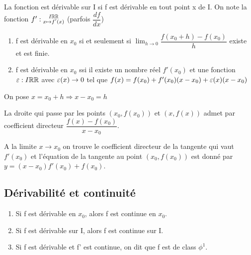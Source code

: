 \documentclass[a4paper, 12pt]{article}
\begin{document}
\begin{definition}
    La fonction est dérivable sur I si f est dérivable en tout point x de I.
    On note la fonction $f': \substack{I \mathbb{R} \mathbb{R} \\ x \mapsto f'(x)}$ (parfois $\dfrac{df}{dx}$)
\end{definition}

\begin{proposition}
    \begin{enumerate}
        \item f est dérivable en $x_0$ si et seulement si $\lim_{h \to 0}\dfrac{f(x_0 + h)- f(x_0)}{h}$ existe et est finie.
        \item f est dérivable en $x_0$ ssi il existe un nombre réel $f'(x_0)$ et une fonction $\varepsilon: I \mathbb{R} \mathbb{R}$ avec
        $\varepsilon(x) \to 0$ %
        tel que $f(x) = f(x_0) + f'(x_0)(x - x_0) + \varepsilon(x)(x-x_0)$
    \end{enumerate}
\end{proposition}

\begin{demonstration}
    On pose $x = x_0 + h \Rightarrow x - x_0 = h$
\end{demonstration}

\begin{definition}
    La droite qui passe par les points $(x_0, f(x_0))$ et $(x, f(x))$ admet par coefficient directeur $\dfrac{f(x) - f(x_0)}{x - x_0}$.

    A la limite $x \rightarrow x_0$ on trouve le coefficient directeur de la tangente qui vaut $f'(x_0)$ et l'équation de la tangente au point
    $(x_0, f(x_0))$ est donné par $y = (x - x_0)f'(x_0) + f(x_0)$.
\end{definition}

\subsection{Dérivabilité et continuité}

\begin{proposition}
    \begin{enumerate}
        \item Si f est dérivable en $x_0$, alors f est continue en $x_0$.
        \item Si f est dérivable sur I, alors f est continue sur I.
        \item Si f est dérivable et f' est continue, on dit que f est de class $\phi^1$. %
    \end{enumerate}
\end{proposition}
\end{document}
